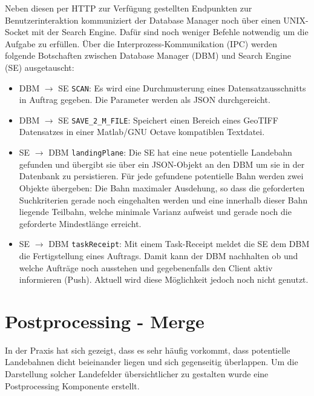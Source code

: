 \documentclass[10pt,a4paper]{report}
\begin{document}
Neben diesen per HTTP zur Verfügung gestellten Endpunkten zur Benutzerinteraktion kommuniziert der Database Manager noch über einen UNIX-Socket mit der Search Engine. Dafür sind noch weniger Befehle notwendig um die Aufgabe zu erfüllen. Über die Interprozess-Kommunikation (IPC) werden folgende Botschaften zwischen Database Manager (DBM) und Search Engine (SE) ausgetauscht:
\begin{itemize}
	\item DBM $\rightarrow$ SE \texttt{SCAN}: Es wird eine Durchmusterung eines Datensatzausschnitts in Auftrag gegeben. Die Parameter werden als JSON durchgereicht.
	\item DBM $\rightarrow$ SE \texttt{SAVE\_2\_M\_FILE}: Speichert einen Bereich eines GeoTIFF Datensatzes in einer Matlab/GNU Octave kompatiblen Textdatei.
	\item SE $\rightarrow$ DBM \texttt{landingPlane}: Die SE hat eine neue potentielle Landebahn gefunden und übergibt sie über ein JSON-Objekt an den DBM um sie in der Datenbank zu persistieren. Für jede gefundene potentielle Bahn werden zwei Objekte übergeben: Die Bahn maximaler Ausdehung, so dass die geforderten Suchkriterien gerade noch eingehalten werden und eine innerhalb dieser Bahn liegende Teilbahn, welche minimale Varianz aufweist und gerade noch die geforderte Mindestlänge erreicht.
	\item SE $\rightarrow$ DBM \texttt{taskReceipt}: Mit einem Task-Receipt meldet die SE dem DBM die Fertigstellung eines Auftrags. Damit kann der DBM nachhalten ob und welche Aufträge noch ausstehen und gegebenenfalls den Client aktiv informieren (Push). Aktuell wird diese Möglichkeit jedoch noch nicht genutzt.
\end{itemize}

\section{Postprocessing - Merge}

In der Praxis hat sich gezeigt, dass es sehr häufig vorkommt, dass potentielle Landebahnen dicht beieinander liegen und sich gegenseitig überlappen. Um die Darstellung solcher Landefelder übersichtlicher zu gestalten wurde eine Postprocessing Komponente erstellt.
\end{document}

